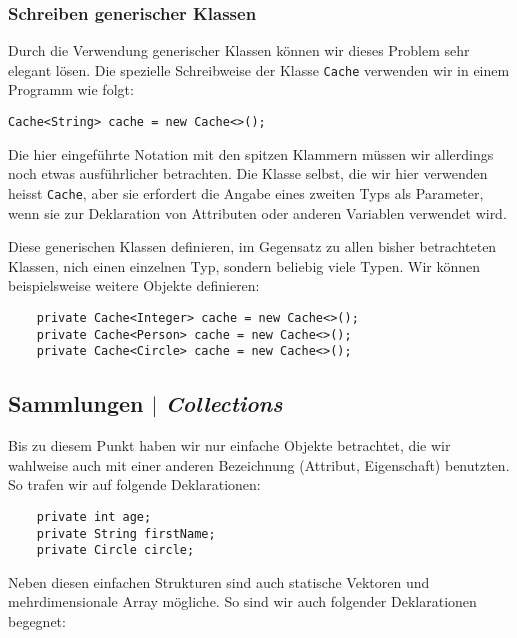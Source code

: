 \begin{Exercise}[%
title={Verwalten von Studenten und Kursbelegungen},
label={ex:course}]
\begin{frame}[fragile]
    \frametitle<presentation>{Schreiben generischer Klassen}
\end{frame}


Durch die Verwendung generischer Klassen können wir dieses Problem sehr elegant
lösen. Die spezielle Schreibweise der Klasse \texttt{Cache} verwenden wir in
einem Programm wie folgt:

\texttt{Cache<String> cache = new Cache<>();}

Die hier eingeführte Notation mit den spitzen Klammern müssen wir allerdings noch
etwas ausführlicher betrachten. Die Klasse selbst, die wir hier verwenden heisst
\texttt{Cache}, aber sie erfordert die Angabe eines zweiten Typs als Parameter,
wenn sie zur Deklaration von Attributen oder anderen Variablen verwendet wird.

Diese generischen Klassen definieren, im Gegensatz zu allen bisher betrachteten
Klassen, nich einen einzelnen Typ, sondern beliebig viele Typen. Wir können
beispielsweise weitere Objekte definieren:

\begin{verbatim}
    private Cache<Integer> cache = new Cache<>();
    private Cache<Person> cache = new Cache<>();
    private Cache<Circle> cache = new Cache<>();
\end{verbatim}




\subsection{Sammlungen $|$ \emph{Collections}}
\label{subsec:collections}

Bis zu diesem Punkt haben wir nur einfache Objekte betrachtet, die wir
wahlweise auch mit einer anderen Bezeichnung (Attribut, Eigenschaft)
benutzten. So trafen wir auf folgende Deklarationen:

\begin{verbatim}
    private int age;
    private String firstName;
    private Circle circle;
\end{verbatim}

Neben diesen einfachen Strukturen sind auch statische Vektoren und
mehrdimensionale Array mögliche. So sind wir auch folgender Deklarationen
begegnet:


\end{Exercise}
